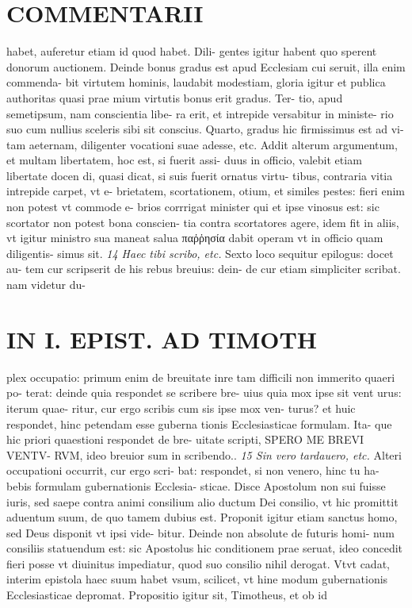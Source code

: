 \documentclass{article}
\begin{document}
\begin{pages}
\section*{COMMENTARII }\pstart habet, auferetur etiam id quod habet. Dili- gentes igitur habent quo sperent donorum auctionem. Deinde bonus gradus est apud Ecclesiam cui seruit, illa enim commenda- bit virtutem hominis, laudabit modestiam, gloria igitur et publica authoritas quasi prae mium virtutis bonus erit gradus. Ter- tio, apud semetipsum, nam conscientia libe- ra erit, et intrepide versabitur in ministe- rio suo cum nullius sceleris sibi sit conscius. Quarto, gradus hic firmissimus est ad vi- tam aeternam, diligenter vocationi suae adesse, etc. Addit alterum argumentum, et multam libertatem, hoc est, si fuerit assi- duus in officio, valebit etiam libertate docen di, quasi dicat, si suis fuerit ornatus virtu- tibus, contraria vitia intrepide carpet, vt e- brietatem, scortationem, otium, et similes pestes: fieri enim non potest vt commode e- brios corrrigat minister qui et ipse vinosus est: sic scortator non potest bona conscien- tia contra scortatores agere, idem fit in aliis, vt igitur ministro sua maneat salua παῤῥησία dabit operam vt in officio quam diligentis- simus sit.  \pend
\textit{14 Haec tibi scribo, etc. }\pstart Sexto loco sequitur epilogus: docet au- tem cur scripserit de his rebus breuius: dein- de cur etiam simpliciter scribat. nam videtur du-  \pend
\section*{IN I. EPIST. AD TIMOTH }
\marginpar{[ p.77 ]}\pstart plex occupatio: primum enim de breuitate inre tam difficili non immerito quaeri po- terat: deinde quia respondet se scribere bre- uius quia mox ipse sit vent urus: iterum quae- ritur, cur ergo scribis cum sis ipse mox ven- turus? et huic respondet, hinc petendam esse guberna tionis Ecclesiasticae formulam. Ita- que hic priori quaestioni respondet de bre- uitate scripti, SPERO ME BREVI VENTV- RVM, ideo breuior sum in scribendo..  \pend
\textit{15 Sin vero tardauero, etc. }\pstart Alteri occupationi occurrit, cur ergo scri- bat: respondet, si non venero, hinc tu ha- bebis formulam gubernationis Ecclesia- sticae.  \pend\pstart Disce Apostolum non sui fuisse iuris, sed saepe contra animi consilium alio ductum Dei consilio, vt hic promittit aduentum suum, de quo tamem dubius est. Proponit igitur etiam sanctus homo, sed Deus disponit vt ipsi vide- bitur. Deinde non absolute de futuris homi- num consiliis statuendum est: sic Apostolus hic conditionem prae seruat, ideo concedit fieri posse vt diuinitus impediatur, quod suo consilio nihil derogat. Vtvt cadat, interim epistola haec suum habet vsum, scilicet, vt hine modum gubernationis Ecclesiasticae depromat.  \pend\pstart Propositio igitur sit, Timotheus, et ob id  \pend
\marginpar{[ p.78 ]}

\end{pages}
\end{document}
